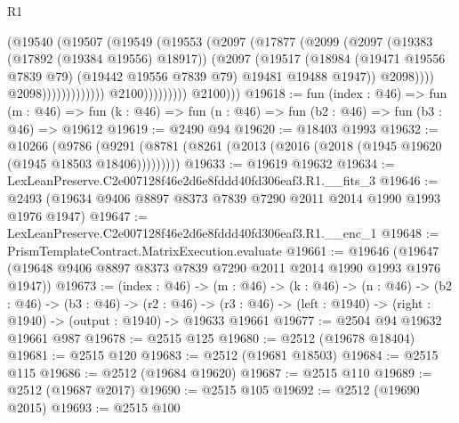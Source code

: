 \begin{lexlean}{R1}
\begin{coremodule}
                                            (@19540
                                              (@19507
                                                (@19549
                                                  (@19553
                                                    (@2097
                                                      (@17877
                                                        (@2099
                                                          (@2097
                                                            (@19383 (@17892 (@19384 @19556) @18917))
                                                            (@2097
                                                              (@19517
                                                                (@18984
                                                                  (@19471 @19556 @7839 @79)
                                                                  (@19442 @19556 @7839 @79)
                                                                  @19481
                                                                  @19488
                                                                  @1947))
                                                              @2098))))
                                                      @2098)))))))))))))
                            @2100)))))))))
          @2100)))
@19618 := fun (index : @46) =>
  fun (m : @46) => fun (k : @46) => fun (n : @46) => fun (b2 : @46) => fun (b3 : @46) => @19612
@19619 := @2490 @94
@19620 := @18403 @1993
@19632 := @10266
    (@9786 (@9291 (@8781 (@8261 (@2013 (@2016 (@2018 (@1945 @19620 (@1945 @18503 @18406)))))))))
@19633 := @19619 @19632
@19634 := LexLeanPreserve.C2e007128f46e2d6e8fddd40fd306eaf3.R1.__fits_3
@19646 := @2493 (@19634 @9406 @8897 @8373 @7839 @7290 @2011 @2014 @1990 @1993 @1976 @1947)
@19647 := LexLeanPreserve.C2e007128f46e2d6e8fddd40fd306eaf3.R1.__enc_1
@19648 := PrismTemplateContract.MatrixExecution.evaluate
@19661 := @19646 (@19647 (@19648 @9406 @8897 @8373 @7839 @7290 @2011 @2014 @1990 @1993 @1976 @1947))
@19673 := (index : @46) ->
  (m : @46) ->
  (k : @46) ->
  (n : @46) ->
  (b2 : @46) ->
  (b3 : @46) ->
  (r2 : @46) -> (r3 : @46) -> (left : @1940) -> (right : @1940) -> (output : @1940) -> @19633 @19661
@19677 := @2504 @94 @19632 @19661 @987
@19678 := @2515 @125
@19680 := @2512 (@19678 @18404)
@19681 := @2515 @120
@19683 := @2512 (@19681 @18503)
@19684 := @2515 @115
@19686 := @2512 (@19684 @19620)
@19687 := @2515 @110
@19689 := @2512 (@19687 @2017)
@19690 := @2515 @105
@19692 := @2512 (@19690 @2015)
@19693 := @2515 @100

\end{coremodule}
\end{lexlean}
